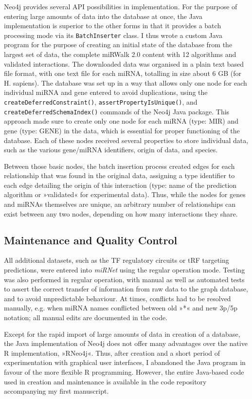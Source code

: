 Neo4j provides several API possibilities in implementation. For the purpose of entering large amounts of data into the database at once, the Java implementation is superior to the other forms in that it provides a batch processing mode via its \texttt{BatchInserter} class. I thus wrote a custom Java program for the purpose of creating an initial state of the database from the largest set of data, the complete miRWalk 2.0 content with 12 algorithms and validated interactions. The downloaded data was organised in a plain text based file format, with one text file for each miRNA, totalling in size about 6 GB (for H. sapiens). The database was set up in a way that allows only one node for each individual miRNA and gene entered to avoid duplications, using the \texttt{createDeferredConstraint()}, \texttt{assertPropertyIsUnique()}, and \texttt{createDeferredSchemaIndex()} commands of the Neo4j Java package. This approach made sure to create only one node for each miRNA (type: MIR) and gene (type: GENE) in the data, which is essential for proper functioning of the database. Each of these nodes received several properties to store individual data, such as the various gene/miRNA identifiers, origin of data, and species. 

Between those basic nodes, the batch insertion process created edges for each relationship that was found in the original data, assigning a type identifier to each edge detailing the origin of this interaction (type: name of the prediction algorithm or »validated« for experimental data). Thus, while the nodes for genes and miRNAs themselves are unique, an arbitrary number of relationships can exist between any two nodes, depending on how many interactions they share.

\subsection{Maintenance and Quality Control}
All additional datasets, such as the TF regulatory circuits or tRF targeting predictions, were entered into \textit{miRNet} using the regular operation mode. Testing was also performed in regular operation, with manual as well as automated tests to assert the correct transfer of information from raw data to the graph database, and to avoid unpredictable behaviour. At times, conflicts had to be resolved manually, e.g. when miRNA names conflicted between old »*« and new 3p/5p notation; all manual edits are documented in the code.

Except for the rapid import of large amounts of data in creation of a database, the Java implementation of Neo4j does not offer many advantages over the native R implementation, »RNeo4j«. Thus, after creation and a short period of experimentation with graphical user interfaces, I abandoned the Java program in favour of the more flexible R programming. However, the entire Java-based code used in creation and maintenance is available in the code repository accompanying my first manuscript\cite{Lobentanzer2019}.

